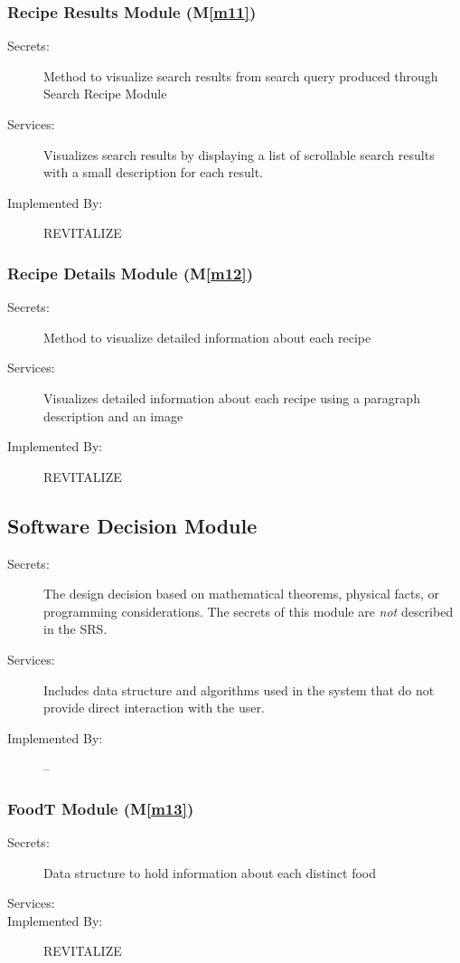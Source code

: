 \documentclass[12pt, titlepage]{article}
\newcommand{\mref}[1]{M\ref{#1}}
\begin{document}
\subsubsection{Recipe Results Module (\mref{m11})}
\begin{description}
	\item[Secrets:]Method to visualize search results from search query produced through Search Recipe Module
	\item[Services:]Visualizes search results by displaying a list of scrollable search results with a small description for each result.
	\item[Implemented By:] REVITALIZE
\end{description}

\subsubsection{Recipe Details Module (\mref{m12})}
\begin{description}
	\item[Secrets:]Method to visualize detailed information about each recipe
	\item[Services:]Visualizes detailed information about each recipe using a paragraph description and an image
	\item[Implemented By:] REVITALIZE
\end{description}


\subsection{Software Decision Module}

\begin{description}
	\item[Secrets:] The design decision based on mathematical theorems, physical
	facts, or programming considerations. The secrets of this module are
	\emph{not} described in the SRS.
	\item[Services:] Includes data structure and algorithms used in the system that
	do not provide direct interaction with the user. 
	\item[Implemented By:] --
\end{description}

\subsubsection{FoodT Module (\mref{m13})}
\begin{description}
	\item[Secrets:] Data structure to hold information about each distinct food
	\item[Services:]
	\item[Implemented By:] REVITALIZE
\end{description}
\end{document}
